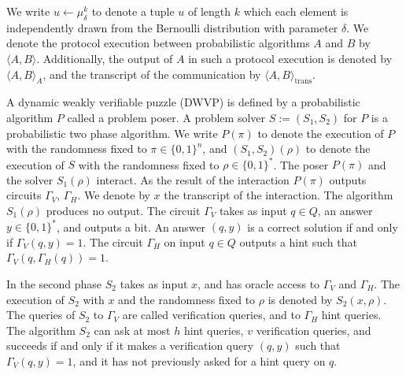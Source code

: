 %
%
\noindent
We write $u \leftarrow \mu_{\delta}^k$ to denote a tuple $u$ of length $k$ which each element
is independently drawn from the Bernoulli distribution with parameter $\delta$.
We denote the protocol execution between probabilistic algorithms $A$ and $B$ by $\langle A, B \rangle$.
Additionally, the output of $A$ in such a protocol execution is denoted by $\langle A, B \rangle_A$, and the transcript
of the communication by $\langle A, B \rangle_{\text{trans}}$.
%
\begin{definition}
  \label{def:dwvp}
  A dynamic weakly verifiable puzzle (DWVP) is defined by a probabilistic algorithm $P$
  called a problem poser.
  A problem solver $S := (S_1, S_2)$ for $P$ is a probabilistic two phase algorithm.
  We write $P(\pi)$ to denote the execution of $P$ with the randomness fixed to $\pi \in \{0,1\}^n$, and $(S_1,S_2)(\rho)$
  to denote the execution of $S$ with the randomness fixed to $\rho \in \{0,1\}^{*}$.
  The poser $P(\pi)$ and the solver $S_1(\rho)$ interact.
  As the result of the interaction $P(\pi)$ outputs circuits $\Gamma_{V}$, $\Gamma_{H}$.
  We denote by $x$ the transcript of the interaction. The algorithm $S_1(\rho)$ produces no output.
  The circuit $\Gamma_{V}$ takes as input $q \in Q$, an answer $y \in \{0,1\}^*$,
  and outputs a bit. An answer $(q,y)$ is a correct solution if and only if $\Gamma_V(q,y) = 1$.
  The circuit $\Gamma_H$ on input $q \in Q$ outputs a hint such that $\Gamma_V(q,\Gamma_H(q)) = 1$.

  In the second phase $S_2$ takes as input $x$, and has oracle access to $\Gamma_V$ and $\Gamma_H$.
  The execution of $S_2$ with $x$ and the randomness fixed to $\rho$
  is denoted by $S_2(x, \rho)$. The queries of $S_2$ to $\Gamma_V$ are called verification queries, and to $\Gamma_H$ hint queries.
  The algorithm $S_2$ can ask at most $h$ hint queries, $v$ verification queries, and succeeds if and only if
  it makes a verification query $(q,y)$ such that $\Gamma_V(q,y) = 1$, and it has not previously asked for a hint query on $q$.
\end{definition}
%
